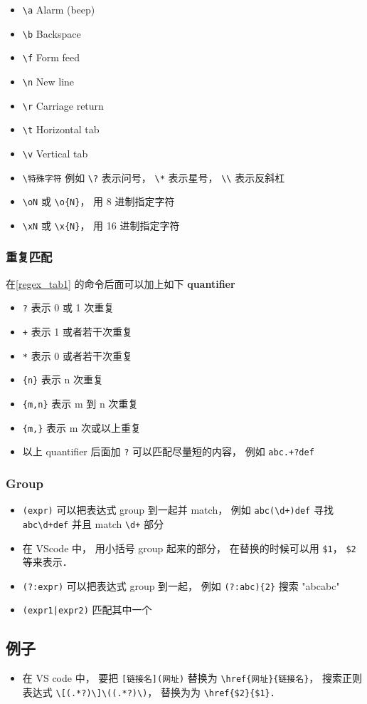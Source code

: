 \begin{itemize}
\item \verb`\a` Alarm (beep)
\item \verb`\b` Backspace
\item \verb`\f` Form feed
\item \verb`\n` New line
\item \verb`\r` Carriage return
\item \verb`\t` Horizontal tab
\item \verb`\v` Vertical tab
\item \verb`\特殊字符` 例如 \verb`\?` 表示问号， \verb`\*` 表示星号， \verb`\\` 表示反斜杠
\item \verb`\oN` 或 \verb`\o{N}`， 用 8 进制指定字符
\item \verb`\xN` 或 \verb`\x{N}`， 用 16 进制指定字符
\end{itemize}

\subsubsection{重复匹配}
在\autoref{regex_tab1} 的命令后面可以加上如下 \textbf{quantifier}
\begin{itemize}
\item \verb|?| 表示 0 或 1 次重复
\item \verb|+| 表示 1 或者若干次重复
\item \verb|*| 表示 0 或者若干次重复
\item \verb|{n}| 表示 n 次重复
\item \verb|{m,n}| 表示 m 到 n 次重复
\item \verb|{m,}| 表示 m 次或以上重复
\item 以上 quantifier 后面加 \verb|?| 可以匹配尽量短的内容， 例如 \verb|abc.+?def|
\end{itemize}

\subsubsection{Group}
\begin{itemize}
\item \verb|(expr)| 可以把表达式 group 到一起并 match， 例如 \verb|abc(\d+)def| 寻找 \verb|abc\d+def| 并且 match \verb|\d+| 部分
\item 在 VScode 中， 用小括号 group 起来的部分， 在替换的时候可以用 \verb|$1|， \verb|$2| 等来表示．
\item \verb|(?:expr)| 可以把表达式 group 到一起， 例如 \verb|(?:abc){2}| 搜索 "abcabc"
\item \verb`(expr1|expr2)` 匹配其中一个
\end{itemize}


\subsection{例子}
\begin{itemize}
\item 在 VS code 中， 要把 \verb|[链接名](网址)| 替换为 \verb|\href{网址}{链接名}|， 搜索正则表达式 \verb|\[(.*?)\]\((.*?)\)|， 替换为为 \verb|\href{$2}{$1}|．
\end{itemize}

